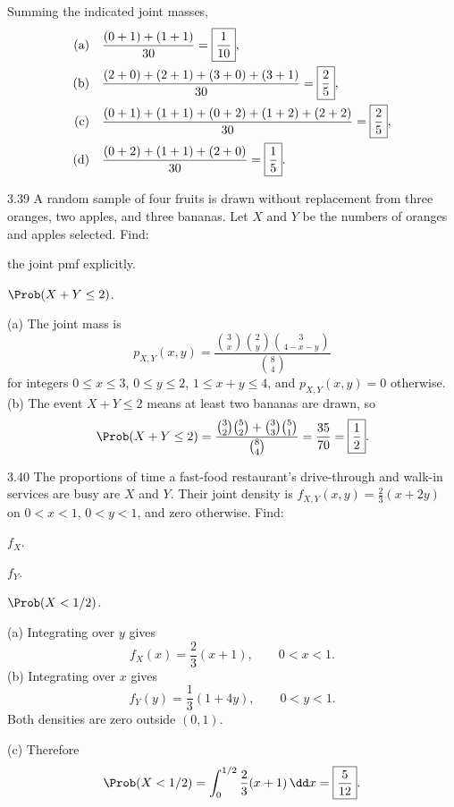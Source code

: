 \documentclass[11pt,oneside]{article}
\begin{document}
\begin{solution}
Summing the indicated joint masses,
\begin{align*}
\textup{(a)}\quad&\frac{(0+1)+(1+1)}{30}=\boxed{\frac1{10}},\\
\textup{(b)}\quad&\frac{(2+0)+(2+1)+(3+0)+(3+1)}{30}=\boxed{\frac25},\\
\textup{(c)}\quad&\frac{(0+1)+(1+1)+(0+2)+(1+2)+(2+2)}{30}=\boxed{\frac25},\\
\textup{(d)}\quad&\frac{(0+2)+(1+1)+(2+0)}{30}=\boxed{\frac15}.
\end{align*}
\end{solution}

\begin{exercise}{3.39}
A random sample of four fruits is drawn without replacement from three oranges, two apples, and three bananas. Let $X$ and $Y$ be the numbers of oranges and apples selected.
Find:
\begin{exercisesubparts}
\item the joint pmf explicitly.
\item $\Prob(X+Y\le2)$.
\end{exercisesubparts}
\end{exercise}

\begin{solution}
\textup{(a)} The joint mass is
\[
\boxed{p_{X,Y}(x,y)=\frac{\binom{3}{x}\binom{2}{y}\binom{3}{4-x-y}}{\binom{8}{4}}}
\]
for integers $0\le x\le3$, $0\le y\le2$, $1\le x+y\le4$, and $p_{X,Y}(x,y)=0$ otherwise.
\noindent\textup{(b)} The event $X+Y\le2$ means at least two bananas are drawn, so
\[
\Prob(X+Y\le2)
=\frac{\binom{3}{2}\binom{5}{2}+\binom{3}{3}\binom{5}{1}}{\binom{8}{4}}
=\frac{35}{70}=\boxed{\frac12}.
\]
\end{solution}

\begin{exercise}{3.40}
The proportions of time a fast-food restaurant's drive-through and walk-in services are busy are $X$ and $Y$. Their joint density is $f_{X,Y}(x,y)=\frac23(x+2y)$ on $0<x<1$, $0<y<1$, and zero otherwise. Find:
\begin{exercisesubparts}
\item $f_X$.
\item $f_Y$.
\item $\Prob(X<1/2)$.
\end{exercisesubparts}
\end{exercise}

\begin{solution}
\noindent\textup{(a)} Integrating over $y$ gives
\[
\boxed{f_X(x)=\frac23(x+1)},\qquad 0<x<1.
\]
\noindent\textup{(b)} Integrating over $x$ gives
\[
\boxed{f_Y(y)=\frac13(1+4y)},\qquad 0<y<1.
\]
Both densities are zero outside $(0,1)$.\par\medskip
\noindent\textup{(c)} Therefore
\[
\Prob(X<1/2)=\int_0^{1/2}\frac23(x+1)\,\dd x=\boxed{\frac5{12}}.
\]
\end{solution}
\end{document}
